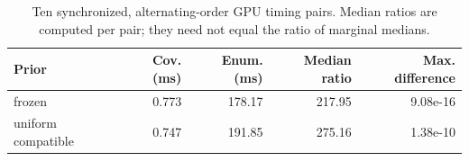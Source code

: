 \begin{table}[tbp]
\centering
\caption{Ten synchronized, alternating-order GPU timing pairs. Median ratios are computed per pair; they need not equal the ratio of marginal medians.}
\label{tab:timing}
\scriptsize
\setlength{\tabcolsep}{3pt}
\begin{tabular}{lrrrr}
\toprule
Prior & Cov. (ms) & Enum. (ms) & Median ratio & Max. difference \\
\midrule
frozen & 0.773 & 178.17 & 217.95 & 9.08e-16 \\
uniform compatible & 0.747 & 191.85 & 275.16 & 1.38e-10 \\
\bottomrule
\end{tabular}
\end{table}
